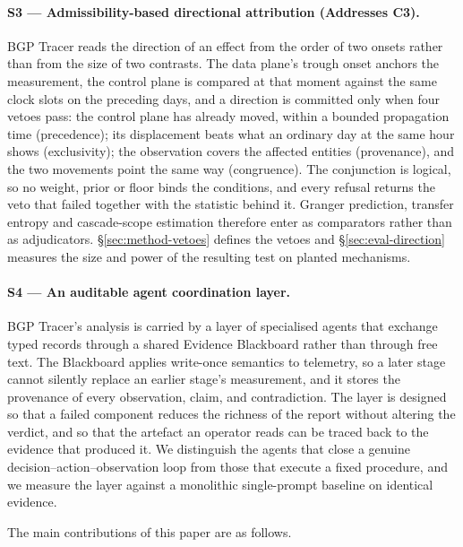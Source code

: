 \paragraph{S3 --- Admissibility-based directional attribution
(Addresses C3).}
BGP Tracer reads the direction of an effect from the order of two onsets
rather than from the size of two contrasts. The data plane's trough onset
anchors the measurement, the control plane is compared at that moment
against the same clock slots on the preceding days, and a direction is
committed only
when four vetoes pass: the control plane has already moved, within a
bounded propagation time (precedence); its displacement beats what an
ordinary day at the same hour shows (exclusivity); the
observation covers the affected entities (provenance), and the two
movements point the same way (congruence). The
conjunction is logical, so no weight, prior or floor binds the
conditions, and every refusal returns the veto that failed together with
the statistic behind it. Granger prediction, transfer entropy and
cascade-scope estimation therefore enter as comparators rather than as
adjudicators. \S\ref{sec:method-vetoes} defines the vetoes and
\S\ref{sec:eval-direction} measures the size and power of the resulting
test on planted mechanisms.

\paragraph{S4 --- An auditable agent coordination layer.}
BGP Tracer's analysis is carried by a layer of specialised agents that
exchange typed records through a shared Evidence Blackboard rather than
through free text. The Blackboard applies write-once semantics to
telemetry, so a later stage cannot silently replace an earlier stage's
measurement, and it stores the provenance of every observation, claim, and
contradiction. The layer is designed so that a failed component reduces
the richness of the report without altering the verdict, and so that the
artefact an operator reads can be traced back to the evidence that
produced it. We distinguish the agents that close a genuine
decision--action--observation loop from those that execute a fixed
procedure, and we measure the layer against a monolithic single-prompt
baseline on identical evidence.

The main contributions of this paper are as follows.


